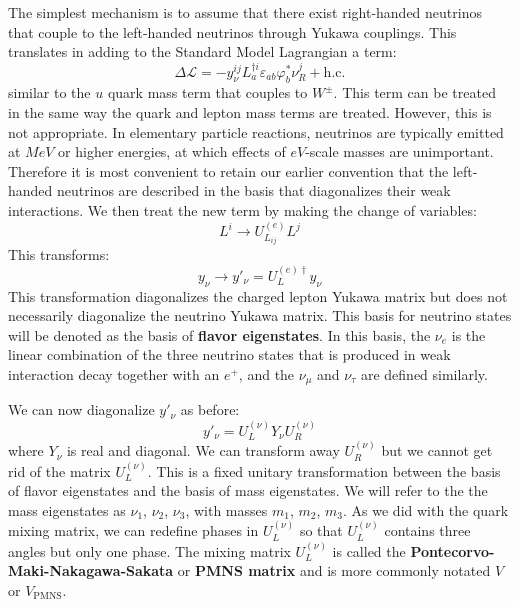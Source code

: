 \documentclass[../../main/main.tex]{subfiles}
\begin{document}
The simplest mechanism is to assume that there exist right-handed neutrinos that couple to the left-handed neutrinos through Yukawa couplings. This translates in adding to the Standard Model Lagrangian a term:
\begin{equation}
	\Delta \mathcal{L}
	=
	- y^{ij}_{\nu} L^{\dag i}_a \varepsilon_{ab} \varphi^*_b \nu^j_R
	+ \text{h.c.}
	\label{eq:}
\end{equation}
similar to the \( u \) quark mass term that couples to \( W^{\pm} \). This term can be treated in the same way the quark and lepton mass terms are treated. However, this is not appropriate. In elementary particle reactions, neutrinos are typically emitted at \( \si{MeV} \) or higher energies, at which effects of \( \si{eV} \)-scale masses are unimportant. Therefore it is most convenient to retain our earlier convention that the left-handed neutrinos are described in the basis that diagonalizes their weak interactions. We then treat the new term by making the change of variables:
\begin{equation}
	L^i \longrightarrow U^{(e)}_{L_{ij}} L^j
	\label{eq:}
\end{equation}
This transforms:
\begin{equation}
	y_{\nu} \longrightarrow y'_{\nu} = U^{(e)\dag}_L y_{\nu}
	\label{eq:}
\end{equation}
This transformation diagonalizes the charged lepton Yukawa matrix but does not necessarily diagonalize the neutrino Yukawa matrix. This basis for neutrino states will be denoted as the basis of \textbf{flavor eigenstates}. In this basis, the \( \nu_e \) is the linear combination of the three neutrino states that is produced in weak interaction decay together with an \( e^+ \), and the \( \nu_{\mu} \) and \( \nu_{\tau} \) are defined similarly.

We can now diagonalize \( y'_{\nu} \) as before:
\begin{equation}
	y'_{\nu}
	=
	U^{(\nu)}_L Y_{\nu} U^{(\nu)}_R
	\label{eq:}
\end{equation}
where \( Y_{\nu} \) is real and diagonal. We can transform away \( U^{(\nu)}_R \) but we cannot get rid of the matrix \( U^{(\nu)}_L \). This is a fixed unitary transformation between the basis of flavor eigenstates and the basis of mass eigenstates. We will refer to the the mass eigenstates as \( \nu_1 \), \( \nu_2 \), \( \nu_3 \), with masses \( m_1 \), \( m_2 \), \( m_3 \). As we did with the quark mixing matrix, we can redefine phases in \( U^{(\nu)}_L \) so that \( U^{(\nu)}_L \) contains three angles but only one phase.
The mixing matrix \( U^{(\nu)}_L \) is called the \textbf{Pontecorvo-Maki-Nakagawa-Sakata} or \textbf{PMNS matrix} and is more commonly notated \( V \) or \( V_{\mathrm{PMNS}} \).
\end{document}

